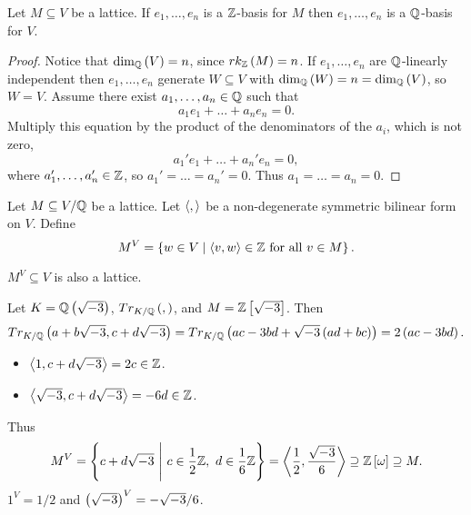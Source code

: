 \begin{lemma}
Let $ M \subseteq V $ be a lattice. If $ e_1, \dots, e_n $ is a $ \mathbb{Z} $-basis for $ M $ then $ e_1, \dots, e_n $ is a $ \mathbb{Q} $-basis for $ V $.
\end{lemma}

\begin{proof}
Notice that $ \dim_{\mathbb{Q}}\left( V \right) = n $, since $ rk_{\mathbb{Z}}\left( M \right) = n $. If $ e_1, \dots, e_n $ are $ \mathbb{Q} $-linearly independent then $ e_1, \dots, e_n $ generate $ W \subseteq V $ with $ \dim_{\mathbb{Q}}\left( W \right) = n = \dim_{\mathbb{Q}}\left( V \right) $, so $ W = V $. Assume there exist $ a_1, \dots, a_n \in \mathbb{Q} $ such that
$$ a_1e_1 + \dots + a_ne_n = 0. $$
Multiply this equation by the product of the denominators of the $ a_i $, which is not zero,
$$ a_1'e_1 + \dots + a_n'e_n = 0, $$
where $ a_1', \dots, a_n' \in \mathbb{Z} $, so $ a_1' = \dots = a_n' = 0 $. Thus $ a_1 = \dots = a_n = 0 $.
\end{proof}

Let $ M \subseteq V / \mathbb{Q} $ be a lattice. Let $ \left\langle , \right\rangle $ be a non-degenerate symmetric bilinear form on $ V $. Define
$$ M^V = \left\{ w \in V \mid \left\langle v, w \right\rangle \in \mathbb{Z} \ \text{for all} \ v \in M \right\}. $$

\begin{proposition}
\label{prop:duallattice}
$ M^V \subseteq V $ is also a lattice.
\end{proposition}

\begin{example*}
Let $ K = \mathbb{Q}\left( \sqrt{-3} \right) $, $ Tr_{K / \mathbb{Q}}\left( , \right) $, and $ M = \mathbb{Z}\left[ \sqrt{-3} \right] $. Then
$$ Tr_{K / \mathbb{Q}}\left( a + b\sqrt{-3}, c + d\sqrt{-3} \right) = Tr_{K / \mathbb{Q}}\left( ac - 3bd + \sqrt{-3}\left( ad + bc \right) \right) = 2\left( ac - 3bd \right). $$
\begin{itemize}
\item $ \left\langle 1, c + d\sqrt{-3} \right\rangle = 2c \in \mathbb{Z} $.
\item $ \left\langle \sqrt{-3}, c + d\sqrt{-3} \right\rangle = -6d \in \mathbb{Z} $.
\end{itemize}
Thus
$$ M^V = \cb{c + d\sqrt{-3} \ \Bigg| \ c \in \dfrac{1}{2}\Z, \ d \in \dfrac{1}{6}\Z} = \ab{\dfrac{1}{2}, \dfrac{\sqrt{-3}}{6}} \supseteq \Z\sb{\omega} \supseteq M. $$
$ 1^V = 1 / 2 $ and $ \left( \sqrt{-3} \right)^V = -\sqrt{-3} / 6 $.
\end{example*}

